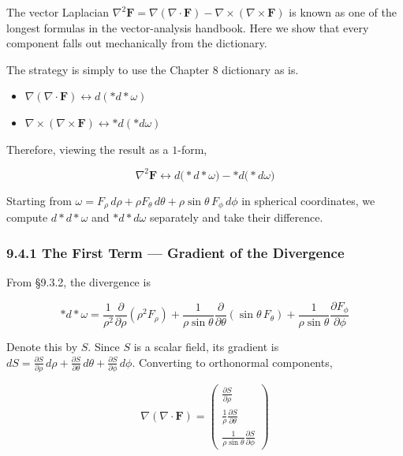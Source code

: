 The vector Laplacian
\(\nabla^2\mathbf{F} = \nabla(\nabla\cdot\mathbf{F}) - \nabla\times(\nabla\times\mathbf{F})\)
is known as one of the longest formulas in the vector-analysis handbook.
Here we show that every component falls out mechanically from the
dictionary.

The strategy is simply to use the Chapter 8 dictionary as is.

\begin{itemize}
\item
  \(\nabla(\nabla\cdot\mathbf{F}) \leftrightarrow d(\ast d\ast\omega)\)
\item
  \(\nabla\times(\nabla\times\mathbf{F}) \leftrightarrow \ast d(\ast d\omega)\)
\end{itemize}

Therefore, viewing the result as a \(1\)-form,

\[\nabla^2\mathbf{F} \leftrightarrow d\bigl(\ast d\ast\omega\bigr)-\ast d\bigl(\ast d\omega\bigr)\]

Starting from
\(\omega = F_\rho\,d\rho + \rho F_\theta\,d\theta + \rho\sin\theta\,F_\phi\,d\phi\)
in spherical coordinates, we compute \(d\ast d\ast\omega\) and
\(\ast d\ast d\omega\) separately and take their difference.

\hypertarget{the-first-term-gradient-of-the-divergence}{%
\subsubsection{9.4.1 The First Term --- Gradient of the
Divergence}\label{the-first-term-gradient-of-the-divergence}}

From §9.3.2, the divergence is

\[\ast d\ast\omega = \frac{1}{\rho^2}\frac{\partial}{\partial\rho}(\rho^2 F_\rho) + \frac{1}{\rho\sin\theta}\frac{\partial}{\partial\theta}(\sin\theta\,F_\theta) + \frac{1}{\rho\sin\theta}\frac{\partial F_\phi}{\partial\phi}\]

Denote this by \(S\). Since \(S\) is a scalar field, its gradient is
\(dS = \frac{\partial S}{\partial\rho}\,d\rho + \frac{\partial S}{\partial\theta}\,d\theta + \frac{\partial S}{\partial\phi}\,d\phi\).
Converting to orthonormal components,

\[\nabla(\nabla\cdot\mathbf{F}) = \begin{pmatrix}
\frac{\partial S}{\partial\rho} \\[0.5em]
\frac{1}{\rho}\frac{\partial S}{\partial\theta} \\[0.5em]
\frac{1}{\rho\sin\theta}\frac{\partial S}{\partial\phi}
\end{pmatrix}\]


